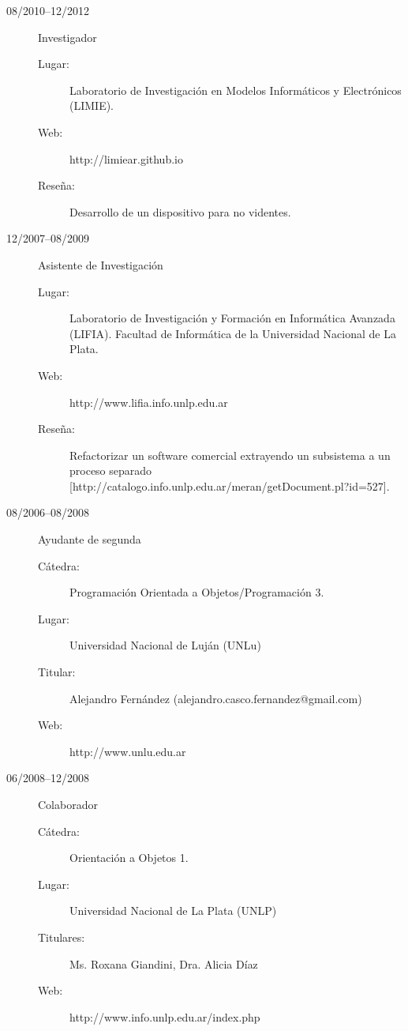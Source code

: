 \documentclass[a4paper]{article}
\begin{document}
\begin{description}
\begin{description}
	\end{description}
\item[08/2010--12/2012] Investigador
	\begin{description}
	\item[Lugar: ] Laboratorio de Investigaci{\'o}n en Modelos Inform{\'a}ticos y Electr{\'o}nicos (LIMIE).
	\item[Web: ] http://limiear.github.io
	\item[Rese\~na: ] Desarrollo de un dispositivo para no videntes.
	\end{description}
\item[12/2007--08/2009] Asistente de Investigaci{\'o}n
	\begin{description}
	\item[Lugar: ] Laboratorio de Investigaci{\'o}n y Formaci{\'o}n en Inform{\'a}tica Avanzada (LIFIA). Facultad de Inform{\'a}tica de la Universidad Nacional de La Plata.
	\item[Web: ] http://www.lifia.info.unlp.edu.ar
	\item[Rese\~na: ] Refactorizar un software comercial extrayendo un subsistema a un proceso separado [http://catalogo.info.unlp.edu.ar/meran/getDocument.pl?id=527].
	\end{description}
\item[08/2006--08/2008] Ayudante de segunda
	\begin{description}
	\item[C{\'a}tedra: ] Programaci{\'o}n Orientada a Objetos/Programaci{\'o}n 3.
	\item[Lugar: ] Universidad Nacional de Luj{\'a}n (UNLu)
	\item[Titular: ] Alejandro Fern{\'a}ndez (alejandro.casco.fernandez@gmail.com)
    \item[Web: ] http://www.unlu.edu.ar
	\end{description}
\item[06/2008--12/2008] Colaborador
	\begin{description}
	\item[C{\'a}tedra: ] Orientaci{\'o}n a Objetos 1.
	\item[Lugar: ] Universidad Nacional de La Plata (UNLP)
	\item[Titulares: ] Ms. Roxana Giandini, Dra. Alicia D{\'i}az
    \item[Web: ] http://www.info.unlp.edu.ar/index.php
	\end{description}
\end{description}
\end{document}
